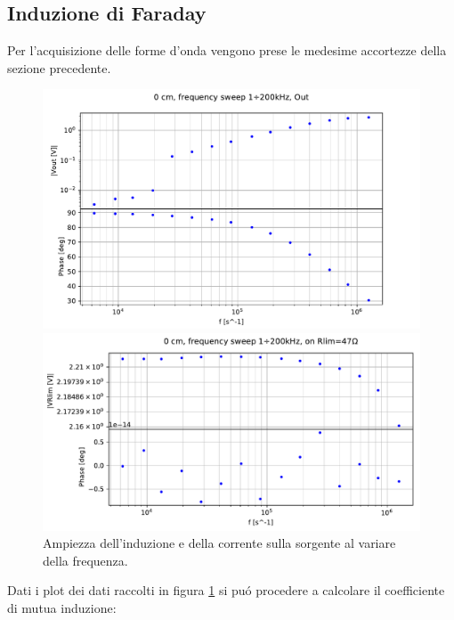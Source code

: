 \subsection{Induzione di Faraday}
Per l'acquisizione delle forme d'onda vengono prese le medesime accortezze della sezione precedente.
\begin{figure}[h]
    \centering
    \begin{minipage}{0.5\textwidth}
        \centering
        \includegraphics[width=\textwidth]{Figure_13.pdf} 
    \end{minipage}\hfill
    \begin{minipage}{0.5\textwidth}
        \centering
        \includegraphics[width=\textwidth]{Figure_14.pdf} 
    \end{minipage}
    \caption{Ampiezza dell'induzione e della corrente sulla sorgente al variare della frequenza.}
    \label{fig:induz}
\end{figure}
Dati i plot dei dati raccolti in figura \ref{fig:induz} si pu\'o procedere a calcolare il coefficiente di mutua induzione:
